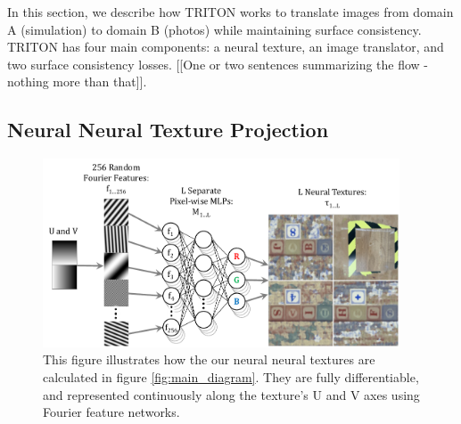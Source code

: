 \documentclass{article}
\begin{document}
		In this section, we describe how TRITON works to translate images from domain A (simulation) to domain B (photos) while maintaining surface consistency. 
		TRITON has four main components: a neural texture, an image translator, and two surface consistency losses. [[One or two sentences summarizing the flow - nothing more than that]].
		

	\subsection{Neural Neural Texture Projection}
		\begin{figure}[thbp]
		    \vspace{-15pt}
			\begin{center}
				\includegraphics[width=300pt]{../images/learnable_textures.pdf}
			\end{center}
			\vspace{-3pt}
			\caption{
				This figure illustrates how the our neural neural textures are calculated in figure \ref{fig:main_diagram}. They are fully differentiable, and represented continuously along the texture's U and V axes using Fourier feature networks.
			}
			\vspace{-10pt}
			\label{fig:learnable_textures}
		\end{figure}
\end{document}

